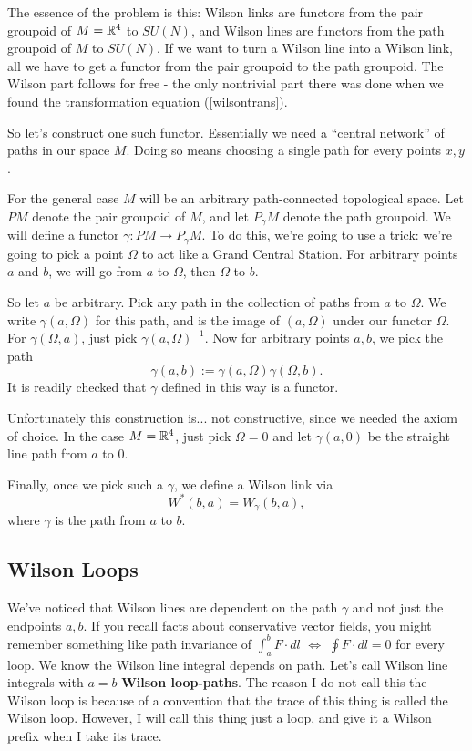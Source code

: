 \documentclass[main.tex]{subfiles}
\begin{document}
The essence of the problem is this: Wilson links are functors from the pair groupoid of $M = \mathbb{R}^4$ to $SU(N)$, and Wilson lines are functors from the path groupoid of $M$ to $SU(N)$. If we want to turn a Wilson line into a Wilson link, all we have to get a functor from the pair groupoid to the path groupoid. The Wilson part follows for free - the only nontrivial part there was done when we found the transformation equation (\ref{wilsontrans}). 

So let's construct one such functor. Essentially we need a ``central network'' of paths in our space $M$. Doing so means choosing a single path for every points $x,y$. 

For the general case $M$ will be an arbitrary path-connected topological space. Let $PM$ denote the pair groupoid of $M$, and let $P_\gamma M$ denote the path groupoid. We will define a functor $\gamma:PM \to P_\gamma M$. To do this, we're going to use a trick: we're going to pick a point $\Omega$ to act like a Grand Central Station. For arbitrary points $a$ and $b$, we will go from $a$ to $\Omega$, then $\Omega$ to $b$. 

So let $a$ be arbitrary. Pick any path in the collection of paths from $a$ to $\Omega$. We write $\gamma (a, \Omega)$ for this path, and is the image of $(a,\Omega)$ under our functor $\Omega$. For $\gamma(\Omega,a)$, just pick $\gamma(a,\Omega)^{-1}$. Now for arbitrary points $a,b$, we pick the path
\[
\gamma(a,b) := \gamma(a,\Omega) \gamma(\Omega,b).
\]
It is readily checked that $\gamma$ defined in this way is a functor.

Unfortunately this construction is... not constructive, since we needed the axiom of choice. In the case $M = \mathbb{R}^4$, just pick $\Omega = 0$ and let $\gamma(a,0)$ be the straight line path from $a$ to $0$.

Finally, once we pick such a $\gamma$, we define a Wilson link via
\[
W^* (b,a) = W_\gamma (b,a),
\]
where $\gamma$ is the path from $a$ to $b$.

\subsection{Wilson Loops}
We've noticed that Wilson lines are dependent on the path $\gamma$ and not just the endpoints $a,b$. If you recall facts about conservative vector fields, you might remember something like path invariance of $\int_a^b F\cdot dl$ $\iff$ $\oint F \cdot dl = 0$ for every loop. We know the Wilson line integral depends on path. Let's call Wilson line integrals with $a = b$ \textbf{Wilson loop-paths}. The reason I do not call this the Wilson loop is because of a convention that the trace of this thing is called the Wilson loop. However, I will call this thing just a loop, and give it a Wilson prefix when I take its trace. 
\end{document}
